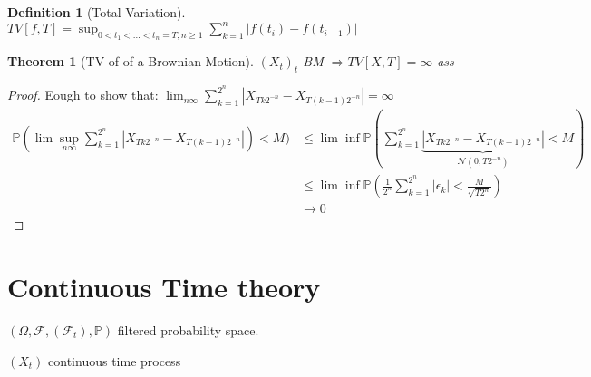\documentclass{article}
\newtheorem{theorem}{Theorem}
\newtheorem{definition}{Definition}
\begin{document}
\begin{definition}[Total Variation]
  $TV[f, T] = \sup_{0 < t_1 < \ldots < t_n=T, n \ge 1} \sum_{k=1}^n |f(t_i) - f(t_{i-1})|$
\end{definition}

\begin{theorem}[TV of of a Brownian Motion]
  $(X_t)_t$ BM $\Rightarrow TV[X, T] = \infty$ ass
\end{theorem}
\begin{proof}
  Eough to show that: $\lim_{n\infty} \sum_{k=1}^{2^n} |X_{Tk2^{-n}} - X_{T(k-1)2^{-n}}| = \infty$
  \begin{align*}
    \mathbb P(\lim\sup_{n\infty} \sum_{k=1}^{2^n} |X_{Tk2^{-n}} - X_{T(k-1)2^{-n}}|) < M)
    &\le \lim\inf \mathbb P(\sum_{k=1}^{2^n} \underbrace{|X_{Tk2^{-n}} - X_{T(k-1)2^{-n}}|}_{\mathcal N(0, T2^{-n})} < M) \\
    &\le \lim\inf \mathbb P(\frac1 {2^n} \sum_{k=1}^{2^n} |\epsilon_k| < \frac M {\sqrt{T2^n}}) \\
    & \rightarrow 0
  \end{align*}
\end{proof}

\section{Continuous Time theory}
$(\Omega, \mathcal F, (\mathcal F_t), \mathbb P)$ filtered probability space.

$(X_t)$ continuous time process
\end{document}
